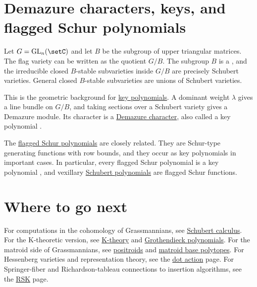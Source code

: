 \section[varietiesForKeys]{Demazure characters, keys, and flagged Schur polynomials}

Let $G=\operatorname{GL}_n(\setC)$ and let $B$ be the subgroup of upper
triangular matrices.  The flag variety can be written as the quotient $G/B$.
The subgroup $B$ is a \label{borelSubgroup}, and the irreducible closed
$B$-stable subvarieties inside $G/B$ are precisely Schubert varieties.  General
closed $B$-stable subvarieties are unions of Schubert varieties.

This is the geometric background for \hyperref[key]{key polynomials}.  A
dominant weight $\lambda$ gives a line bundle on $G/B$, and taking sections
over a Schubert variety gives a Demazure module.  Its character is a
\hyperref[demazureCharacter]{Demazure character}, also called a key polynomial
\cite{Demazure1974nouvelle,Demazure1974}.

The \hyperref[schurFlagged]{flagged Schur polynomials} are closely related.
They are Schur-type generating functions with row bounds, and they occur as
key polynomials in important cases.  In particular, every flagged Schur
polynomial is a key polynomial \cite[Thm.~23]{ReinerShimozono1995}, and
vexillary \hyperref[schubert]{Schubert polynomials} are flagged Schur
functions.


\section[varietiesFurtherReading]{Where to go next}

For computations in the cohomology of Grassmannians, see
\hyperref[schubertCalculus]{Schubert calculus}.  For the K-theoretic version,
see \hyperref[kTheory]{K-theory} and
\hyperref[grothendieck]{Grothendieck polynomials}.  For the matroid side of
Grassmannians, see \hyperref[positroid]{positroids} and
\hyperref[matroidBasePolytope]{matroid base polytopes}.  For Hessenberg
varieties and representation theory, see the \hyperref[dotAction]{dot action}
page.  For Springer-fiber and Richardson-tableau connections to insertion
algorithms, see the \hyperref[rsk]{RSK} page.
